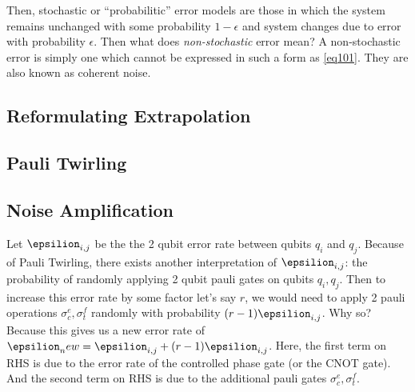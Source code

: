 \documentclass{article}
\begin{document}
Then, stochastic or ``probabilitic'' error models are those in which the system remains unchanged
with some probability \(1-\epsilon\) and system changes due to error with
probability \(\epsilon\). Then what does \textit{non-stochastic} error mean?
A non-stochastic error is simply one which cannot be expressed in such a form as
\ref{eq101}. They are also known as coherent noise.
\subsection{Reformulating Extrapolation}

\subsection{Pauli Twirling}
\subsection{Noise Amplification}
Let \(\epsilion_{i,j}\) be the the 2 qubit error rate between qubits \(q_i\)
and \(q_j\). Because of Pauli Twirling, there exists another interpretation
of \(\epsilion_{i,j}\): the probability of randomly applying 2 qubit pauli
gates on qubits \(q_i, q_j\). Then to increase this error rate by some factor
let's say \(r\), we would need to apply 2 pauli operations \(\sigma_c^{e},
\sigma_t^{f}\) randomly with probability \((r-1)\epsilion_{i,j}\). Why so?
Because this gives us a new error rate of \(\epsilion_new = \epsilion_{i,j}
+ (r-1)\epsilion_{i,j}\). Here, the first term on RHS is due to the error rate
of the controlled phase gate (or the CNOT gate). And the second term on RHS is
due to the additional pauli gates \(\sigma_c^{e},
\sigma_t^{f}\).
\end{document}
